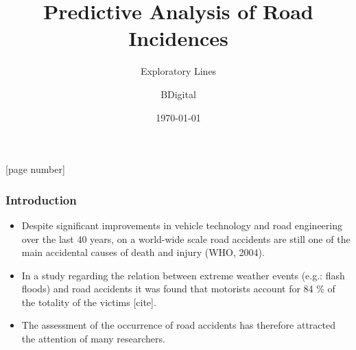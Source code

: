 \documentclass[hyperref={pdfpagelabels=true}]{beamer}
\title{Predictive Analysis of Road Incidences}
\subtitle{Exploratory Lines}
\author{BDigital}
\date{\today}
\begin{document}
\captionsetup{font=scriptsize,labelfont=scriptsize}

[page number]
\begin{frame}
\titlepage
\end{frame} 
 
\begin{frame}
\frametitle{Introduction}
\begin{overprint}
\begin{itemize}
\item Despite significant improvements in vehicle technology and road engineering over the last 40 years, on a world-wide scale 
road accidents are still one of the main accidental causes of death and injury (WHO, 2004).\\
\item In a study regarding the relation between extreme weather events (e.g.: flash floods) and road accidents it was found that motorists account for 84 \% of the totality of the
victims [cite].
\item The assessment of the occurrence of road accidents has therefore attracted the attention of many researchers.
\end{itemize}
\end{overprint}
\end{frame}
\end{document}
